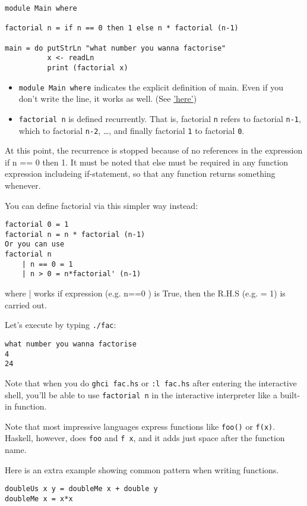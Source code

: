 \begin{lstlisting}
module Main where

factorial n = if n == 0 then 1 else n * factorial (n-1)

main = do putStrLn "what number you wanna factorise"
          x <- readLn
          print (factorial x)
\end{lstlisting}
\begin{itemize}
	\item \lstinline{module Main where} indicates the explicit definition of main. Even if you don't write the line, it works as well. (See \href{https://stackoverflow.com/questions/11112371/to-write-or-not-to-write-module-main-where-in-haskell}{'here'})
	\item \lstinline{factorial n} is defined recurrently.  That is, factorial \lstinline{n} refers to factorial \lstinline{n-1}, which to factorial \lstinline{n-2}, …, and finally factorial \lstinline{1} to factorial \lstinline{0}.  
\end{itemize}

At this point, the recurrence is stopped because of no references in the expression if n == 0 then 1. 
It must be noted that else must be required in any function expression includeing if-statement, 
so that any function returns something whenever.

You can define factorial via this simpler way instead:
\begin{lstlisting}
factorial 0 = 1
factorial n = n * factorial (n-1)
Or you can use 
factorial n
    | n == 0 = 1
    | n > 0 = n*factorial' (n-1)
\end{lstlisting}
where | works if expression (e.g. n==0 ) is True, then the R.H.S (e.g. = 1) is carried out.   

Let’s execute by typing \lstinline{./fac}:
\begin{lstlisting}
what number you wanna factorise
4
24
\end{lstlisting}

Note that when you do \lstinline{ghci fac.hs} or \lstinline{:l fac.hs} after entering the interactive shell, you’ll be able to use \lstinline{factorial n} in the interactive interpreter like a built-in function. 

Note that most impressive languages express functions like \lstinline{foo()} or \lstinline{f(x)}. Haskell, however, does \lstinline{foo} and \lstinline{f x}, and it adds just space after the function name.

Here is an extra example showing common pattern when writing functions. 
\begin{lstlisting}
doubleUs x y = doubleMe x + double y
doubleMe x = x*x 
\end{lstlisting}

